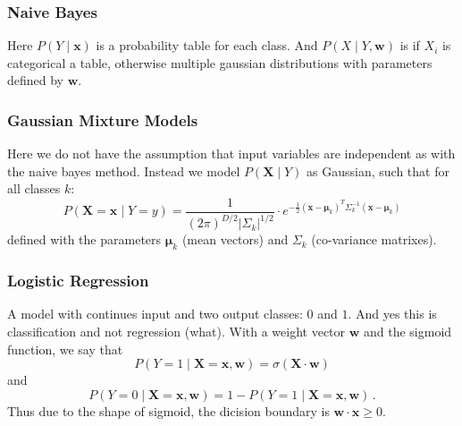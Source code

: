 \subsubsection{Naive Bayes}

\begin{figure}[H]
    \centering
\end{figure}

Here $P(Y \mid \mathbf{x})$ is a probability table for each class.
And $P(X \mid Y, \mathbf{w})$ is if $X_i$ is categorical a table, otherwise multiple gaussian distributions with parameters defined by $\mathbf{w}$.

\subsubsection{Gaussian Mixture Models}

Here we do not have the assumption that input variables are independent as with the naive bayes method.
Instead we model $P(\mathbf{X} \mid Y)$ as Gaussian, such that for all classes $k$:
\[
    P(\mathbf{X} = \mathbf{x} \mid Y = y) = \frac 1 {(2\pi)^{D / 2} | \Sigma_k |^{1 / 2}} \cdot e^{-\frac 1 2 (\mathbf{x} - \mathbf{\mu}_k)^T \Sigma_k^{-1}(\mathbf{x} - \mathbf{\mu}_k)}
\]
defined with the parameters $\mathbf{\mu}_k$ (mean vectors) and $\Sigma_k$ (co-variance matrixes).

\subsubsection{Logistic Regression}

A model with continues input and two output classes: $0$ and $1$.
And yes this is classification and not regression (what).
With a weight vector $\mathbf{w}$ and the sigmoid function, we say that
\[
    P(Y = 1 \mid \mathbf{X} = \mathbf{x}, \mathbf{w}) = \sigma(\mathbf{X} \cdot \mathbf{w})
\]
and
\[
    P(Y = 0 \mid \mathbf{X} = \mathbf{x}, \mathbf{w}) = 1 - P(Y = 1 \mid \mathbf{X} = \mathbf{x}, \mathbf{w})\,.
\]
Thus due to the shape of sigmoid, the dicision boundary is $\mathbf{w} \cdot \mathbf{x} \geq 0$.

